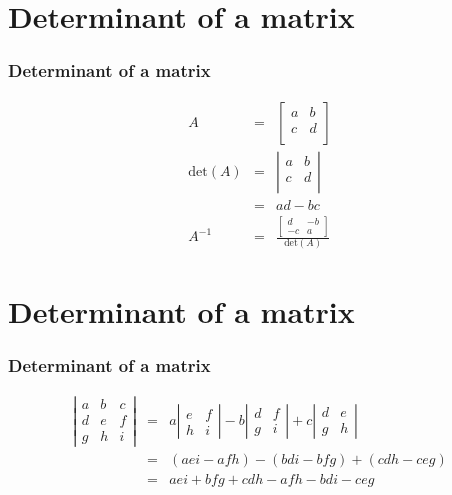 \documentclass[]{beamer}
\newcommand{\sect}[1]{
\section{#1}
\begin{frame}[fragile]\frametitle{#1}
}
\begin{document}
\sect{Determinant of a matrix}
\begin{eqnarray*}
A &=& \left[\begin{array}{cc}
a & b \\
c & d \\
\end{array}\right]\\
\mbox{det}(A) &=&  \left|\begin{array}{cc}
a & b \\
c & d \\
\end{array}\right|\\
&=& ad-bc\\
A^{-1} &=& \frac{\left[\begin{array}{cc}d&-b\\-c&a\end{array}\right]}{\mbox{det}(A)}
\end{eqnarray*}
\end{frame}

\sect{Determinant of a matrix}
\begin{eqnarray*}
\left|\begin{array}{ccc}a&b&c\\d&e&f\\g&h&i\end{array}\right|
&=&
a\left|\begin{array}{cc}e&f\\h&i\end{array}\right|
-b\left|\begin{array}{cc}d&f\\g&i\end{array}\right|
+c\left|\begin{array}{cc}d&e\\g&h\end{array}\right|\\
&=& (aei - afh) - (bdi - bfg) + (cdh - ceg)\\
&=& aei + bfg + cdh - afh - bdi - ceg
\end{eqnarray*}
\end{frame}
\end{document}
